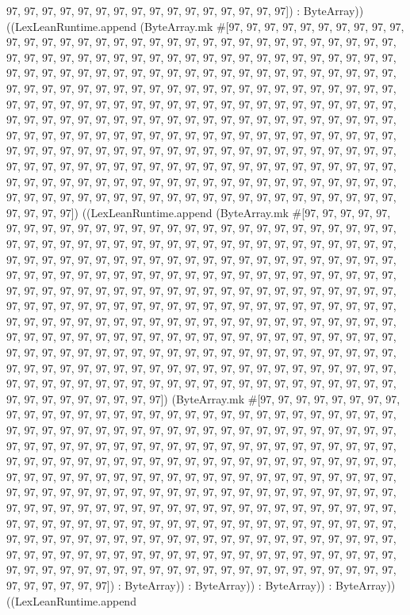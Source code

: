 \documentclass[11pt]{article}
\begin{document}
97, 97, 97, 97, 97, 97, 97, 97, 97, 97, 97, 97, 97, 97, 97, 97]) : ByteArray)) ((LexLeanRuntime.append (ByteArray.mk \#[97, 97, 97, 97, 97, 97, 97, 97, 97, 97, 97, 97, 97, 97, 97, 97, 97, 97, 97, 97, 97, 97, 97, 97, 97, 97, 97, 97, 97, 97, 97, 97, 97, 97, 97, 97, 97, 97, 97, 97, 97, 97, 97, 97, 97, 97, 97, 97, 97, 97, 97, 97, 97, 97, 97, 97, 97, 97, 97, 97, 97, 97, 97, 97, 97, 97, 97, 97, 97, 97, 97, 97, 97, 97, 97, 97, 97, 97, 97, 97, 97, 97, 97, 97, 97, 97, 97, 97, 97, 97, 97, 97, 97, 97, 97, 97, 97, 97, 97, 97, 97, 97, 97, 97, 97, 97, 97, 97, 97, 97, 97, 97, 97, 97, 97, 97, 97, 97, 97, 97, 97, 97, 97, 97, 97, 97, 97, 97, 97, 97, 97, 97, 97, 97, 97, 97, 97, 97, 97, 97, 97, 97, 97, 97, 97, 97, 97, 97, 97, 97, 97, 97, 97, 97, 97, 97, 97, 97, 97, 97, 97, 97, 97, 97, 97, 97, 97, 97, 97, 97, 97, 97, 97, 97, 97, 97, 97, 97, 97, 97, 97, 97, 97, 97, 97, 97, 97, 97, 97, 97, 97, 97, 97, 97, 97, 97, 97, 97, 97, 97, 97, 97, 97, 97, 97, 97, 97, 97, 97, 97, 97, 97, 97, 97, 97, 97, 97, 97, 97, 97, 97, 97, 97, 97, 97, 97, 97, 97, 97, 97, 97, 97, 97, 97, 97, 97, 97, 97, 97, 97, 97, 97, 97, 97, 97, 97, 97, 97, 97, 97, 97, 97, 97, 97, 97, 97]) ((LexLeanRuntime.append (ByteArray.mk \#[97, 97, 97, 97, 97, 97, 97, 97, 97, 97, 97, 97, 97, 97, 97, 97, 97, 97, 97, 97, 97, 97, 97, 97, 97, 97, 97, 97, 97, 97, 97, 97, 97, 97, 97, 97, 97, 97, 97, 97, 97, 97, 97, 97, 97, 97, 97, 97, 97, 97, 97, 97, 97, 97, 97, 97, 97, 97, 97, 97, 97, 97, 97, 97, 97, 97, 97, 97, 97, 97, 97, 97, 97, 97, 97, 97, 97, 97, 97, 97, 97, 97, 97, 97, 97, 97, 97, 97, 97, 97, 97, 97, 97, 97, 97, 97, 97, 97, 97, 97, 97, 97, 97, 97, 97, 97, 97, 97, 97, 97, 97, 97, 97, 97, 97, 97, 97, 97, 97, 97, 97, 97, 97, 97, 97, 97, 97, 97, 97, 97, 97, 97, 97, 97, 97, 97, 97, 97, 97, 97, 97, 97, 97, 97, 97, 97, 97, 97, 97, 97, 97, 97, 97, 97, 97, 97, 97, 97, 97, 97, 97, 97, 97, 97, 97, 97, 97, 97, 97, 97, 97, 97, 97, 97, 97, 97, 97, 97, 97, 97, 97, 97, 97, 97, 97, 97, 97, 97, 97, 97, 97, 97, 97, 97, 97, 97, 97, 97, 97, 97, 97, 97, 97, 97, 97, 97, 97, 97, 97, 97, 97, 97, 97, 97, 97, 97, 97, 97, 97, 97, 97, 97, 97, 97, 97, 97, 97, 97, 97, 97, 97, 97, 97, 97, 97, 97, 97, 97, 97, 97, 97, 97, 97, 97, 97, 97, 97, 97, 97, 97, 97, 97, 97, 97, 97, 97]) (ByteArray.mk \#[97, 97, 97, 97, 97, 97, 97, 97, 97, 97, 97, 97, 97, 97, 97, 97, 97, 97, 97, 97, 97, 97, 97, 97, 97, 97, 97, 97, 97, 97, 97, 97, 97, 97, 97, 97, 97, 97, 97, 97, 97, 97, 97, 97, 97, 97, 97, 97, 97, 97, 97, 97, 97, 97, 97, 97, 97, 97, 97, 97, 97, 97, 97, 97, 97, 97, 97, 97, 97, 97, 97, 97, 97, 97, 97, 97, 97, 97, 97, 97, 97, 97, 97, 97, 97, 97, 97, 97, 97, 97, 97, 97, 97, 97, 97, 97, 97, 97, 97, 97, 97, 97, 97, 97, 97, 97, 97, 97, 97, 97, 97, 97, 97, 97, 97, 97, 97, 97, 97, 97, 97, 97, 97, 97, 97, 97, 97, 97, 97, 97, 97, 97, 97, 97, 97, 97, 97, 97, 97, 97, 97, 97, 97, 97, 97, 97, 97, 97, 97, 97, 97, 97, 97, 97, 97, 97, 97, 97, 97, 97, 97, 97, 97, 97, 97, 97, 97, 97, 97, 97, 97, 97, 97, 97, 97, 97, 97, 97, 97, 97, 97, 97, 97, 97, 97, 97, 97, 97, 97, 97, 97, 97, 97, 97, 97, 97, 97, 97, 97, 97, 97, 97, 97, 97, 97, 97, 97, 97, 97, 97, 97, 97, 97, 97, 97, 97, 97, 97, 97, 97, 97, 97, 97, 97, 97, 97, 97, 97, 97, 97, 97, 97, 97, 97, 97, 97, 97, 97, 97, 97, 97, 97, 97, 97, 97, 97, 97, 97, 97, 97, 97, 97, 97, 97, 97, 97]) : ByteArray)) : ByteArray)) : ByteArray)) : ByteArray)) ((LexLeanRuntime.append 
\end{document}

